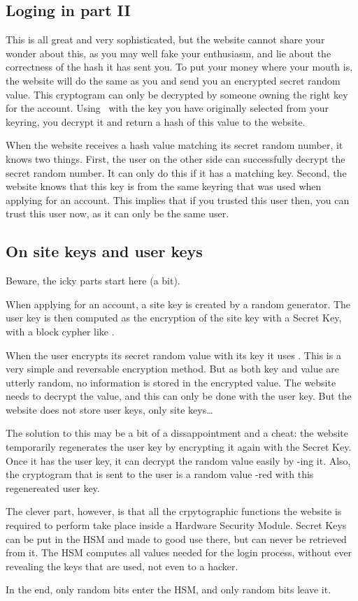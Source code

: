 \subsection{Loging in part II}
This is all great and very sophisticated, but the website cannot share your wonder about this,
as you may well fake your enthusiasm, and lie about the correctness of the hash it has sent you.
To put your money where your mouth is,
the website will do the same as you and send you an encrypted secret random value.
This cryptogram can only be decrypted by someone owning the right key for the account.
Using \XOR\ with the key you have originally selected from your keyring,
you decrypt it and return a hash of this value to the website.
\par
When the website receives a hash value matching its secret random number, it knows two things.
First, the user on the other side can successfully decrypt the secret random number.
It can only do this if it has a matching key.
Second, the website knows that this key is from the same keyring that was used when applying for an account.
This implies that if you trusted this user then, you can trust this user now, as it can only be the same user.

\subsection{On site keys and user keys}
Beware, the icky parts start here (a bit).
\par
When applying for an account, a site key is created by a random generator.
The user key is then computed as the encryption of the site key with a Secret Key, with a block cypher like \AES.
\par
When the user encrypts its secret random value with its key it uses \XOR.
This is a very simple and reversable encryption method.
But as both key and value are utterly random, no information is stored in the encrypted value.
The website needs to decrypt the value, and this can only be done with the user key.
But the website does not store user keys, only site keys\ldots
\par
The solution to this may be a bit of a dissappointment and a cheat:
the website temporarily regenerates the user key by encrypting it again with the Secret Key.
Once it has the user key, it can decrypt the random value easily by \XOR-ing it.
Also, the cryptogram that is sent to the user is a random value \XOR-red with this regenereated user key.
\par
The clever part, however, is that all the crpytographic functions the website is required to perform take place inside a Hardware Security Module.
Secret Keys can be put in the HSM and made to good use there, but can never be retrieved from it.
The HSM computes all values needed for the login process,
without ever revealing the keys that are used, not even to a hacker.
\par
In the end,
only random bits enter the HSM,
and only random bits leave it.

